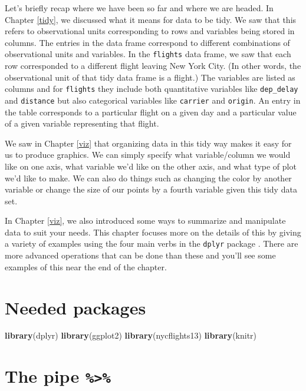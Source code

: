 \documentclass[]{tufte-book}
\newenvironment{Shaded}{\begin{snugshade}}{\end{snugshade}}
\newcommand{\KeywordTok}[1]{\textcolor[rgb]{0.13,0.29,0.53}{\textbf{{#1}}}}
\newcommand{\NormalTok}[1]{{#1}}
\begin{document}
Let's briefly recap where we have been so far and where we are headed.
In Chapter \ref{tidy}, we discussed what it means for data to be tidy.
We saw that this refers to observational units corresponding to rows and
variables being stored in columns. The entries in the data frame
correspond to different combinations of observational units and
variables. In the \texttt{flights} data frame, we saw that each row
corresponded to a different flight leaving New York City. (In other
words, the observational unit of that tidy data frame is a flight.) The
variables are listed as columns and for \texttt{flights} they include
both quantitative variables like \texttt{dep\_delay} and
\texttt{distance} but also categorical variables like \texttt{carrier}
and \texttt{origin}. An entry in the table corresponds to a particular
flight on a given day and a particular value of a given variable
representing that flight.

We saw in Chapter \ref{viz} that organizing data in this tidy way makes
it easy for us to produce graphics. We can simply specify what
variable/column we would like on one axis, what variable we'd like on
the other axis, and what type of plot we'd like to make. We can also do
things such as changing the color by another variable or change the size
of our points by a fourth variable given this tidy data set.

In Chapter \ref{viz}, we also introduced some ways to summarize and
manipulate data to suit your needs. This chapter focuses more on the
details of this by giving a variety of examples using the four main
verbs in the \texttt{dplyr} package \citep{R-dplyr}. There are more
advanced operations that can be done than these and you'll see some
examples of this near the end of the chapter.

\section*{Needed packages}\label{needed-packages-1}

\begin{Shaded}
\begin{Highlighting}[]
\KeywordTok{library}\NormalTok{(dplyr)}
\KeywordTok{library}\NormalTok{(ggplot2)}
\KeywordTok{library}\NormalTok{(nycflights13)}
\KeywordTok{library}\NormalTok{(knitr)}
\end{Highlighting}
\end{Shaded}

\section{\texorpdfstring{The pipe
\texttt{\%\textgreater{}\%}}{The pipe \%\textgreater{}\%}}\label{the-pipe}
\end{document}
